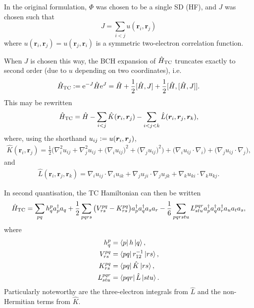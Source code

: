 In the original formulation, $\Phi$ was chosen to be a single \gls{SD} (\gls{HF}), and $J$ was chosen such that
\begin{equation}
    \label{eq:jastrow-two-elec}
    J = \sum_{i<j}u(\bm r_i, \bm r_j)
\end{equation}
where $u(\bm r_i, \bm r_j) = u(\bm r_j, \bm r_i)$ is a symmetric two-electron correlation function.

When $J$ is chosen this way, the \gls{BCH} expansion of $\hat H_\mathrm{TC}$ truncates exactly to second order (due to $u$ depending on two coordinates), i.e.
\begin{equation}
    \hat H_\mathrm{TC} \mathrel{\mathop:}= \mathrm{e}^{-J}\hat H\mathrm{e}^J= \hat H + \frac 12[\hat H, J] + \frac 12[\hat H, [\hat H, J]].
\end{equation}
This may be rewritten
\begin{equation}
    \hat H_\mathrm{TC} = \hat H - \sum_{i<j}\hat K(\bm r_i, \bm r_j) - \sum_{i<j<k}\hat L(\bm r_i, \bm r_j, \bm r_k),
\end{equation}
where, using the shorthand $u_{ij} \mathrel{\mathop:}= u(\bm r_i, \bm r_j)$,
\begin{equation}
\begin{split}
    \hat{K}(\bm{r}_i, \bm{r}_j) = \frac{1}{2} \Bigg(
        \nabla_i^2 u_{ij} + \nabla_j^2 u_{ij} +
        \big(\nabla_i u_{ij}\big)^2
        + \big(\nabla_j u_{ij}\big)^2\Bigg)
        + \big(\nabla_i u_{ij} \cdot \nabla_i\big)
        + \big(\nabla_j u_{ij} \cdot \nabla_j\big)
        ,
\end{split}
\end{equation}
and
\begin{equation}
\begin{split}
\hat{L}(\bm{r}_i, \bm{r}_j, \bm{r}_k) =
\nabla_i u_{ij} \cdot \nabla_i u_{ik} +
\nabla_j u_{ji} \cdot \nabla_j u_{jk} +
\nabla_k u_{ki} \cdot \nabla_k u_{kj}.
\end{split}
\end{equation}

In second quantisation, the TC Hamiltonian can then be written
\begin{equation}
    \hat H_\mathrm{TC} = \sum_{pq} h_q^p a_p^\dagger a_q
    + \frac{1}{2} \sum_{pqrs} \big(V_{rs}^{pq} - K_{rs}^{pq}\big)
    a_p^\dagger a_q^\dagger a_s a_r
    - \frac{1}{6} \sum_{pqrstu} L_{stu}^{pqr}
    a_p^\dagger a_q^\dagger a_r^\dagger a_u a_t a_s,
\end{equation}
where
\begin{equation}
\begin{split}
    h_q^p &= \bra{p}h\ket{q}, \\
    V_{rs}^{pq} &= \bra{p q } r_{12}^{-1} \ket{ r s}, \\
    K_{rs}^{pq} &= \bra{p q } \hat{K} \ket{ r s}, \\
    L_{stu}^{pqr} &= \bra{p q r } \hat{L} \ket{s t u}.
\end{split}
\end{equation}
Particularly noteworthy are the three-electron integrals from $\hat L$ and the non-Hermitian terms from $\hat K$.

